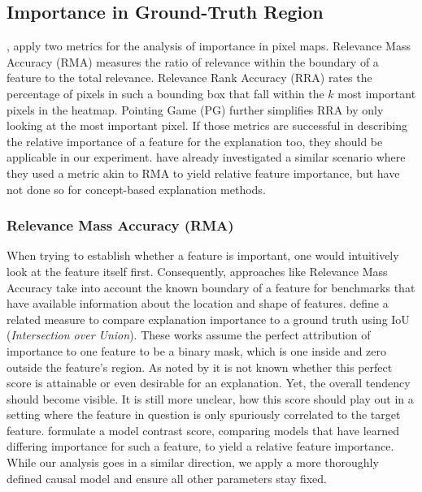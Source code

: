 \subsection{Importance in Ground-Truth Region}\label{section:region_specific}
\citet{Arras2022}, apply two metrics for the analysis of importance in pixel maps. Relevance Mass Accuracy (RMA) measures the ratio of relevance within the boundary of a feature to the total relevance. Relevance Rank Accuracy (RRA) rates the percentage of pixels in such a bounding box that fall within the $k$ most important pixels in the heatmap.  Pointing Game (PG) further simplifies RRA by only looking at the most important pixel. If those metrics are successful in describing the relative importance of a feature for the explanation too, they should be applicable in our experiment. \cite{Yang2019} have already investigated a similar scenario where they used a metric akin to RMA to yield relative feature importance, but have not done so for concept-based explanation methods.

\subsubsection{Relevance Mass Accuracy (RMA)}
When trying to establish whether a feature is important, one would intuitively look at the feature itself first. Consequently, approaches like Relevance Mass Accuracy take into account the known boundary of a feature for benchmarks that have available information about the location and shape of features.
\citet{Bau2017} define a related measure to compare explanation importance to a ground truth using IoU (\textit{Intersection over Union}). These works assume the perfect attribution of importance to one feature to be a binary mask, which is one inside and zero outside the feature's region.
As noted by \citet{Arras2022} it is not known whether this perfect score is attainable or even desirable for an explanation. Yet, the overall tendency should become visible. It is still more unclear, how this score should play out in a setting where the feature in question is only spuriously correlated to the target feature. \citet{Yang2019} formulate a model contrast score, comparing models that have learned differing importance for such a feature, to yield a relative feature importance. While our analysis goes in a similar direction, we apply a more thoroughly defined causal model and ensure all other parameters stay fixed. 

